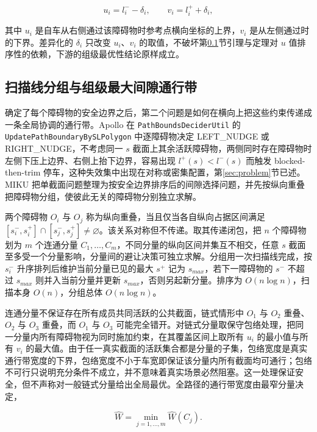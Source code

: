 \documentclass[a4paper,zihao=5]{ctexart}
\theoremstyle{definition}
\begin{document}
\begin{equation}
    u_i = l_i^{-} - \delta_i, \qquad v_i = l_i^{+} + \delta_i,
    \label{eq:dynamic_uv}
\end{equation}

其中 $u_i$ 是自车从右侧通过该障碍物时参考点横向坐标的上界，$v_i$ 是从左侧通过时的下界。差异化的 $\delta_i$ 只改变 $u_i$、$v_i$ 的取值，不破坏第\ref{sec:method_band}节引理与定理对 $u$ 值排序性的依赖，下游的组级最优性结论原样成立。

\subsection{扫描线分组与组级最大间隙通行带}
\label{sec:method_band}

确定了每个障碍物的安全边界之后，第二个问题是如何在横向上把这些约束传递成一条全局协调的通行带。Apollo 在 \texttt{PathBoundsDeciderUtil} 的 \texttt{UpdatePathBoundaryBySLPolygon} 中逐障碍物决定 LEFT\_NUDGE 或 RIGHT\_NUDGE，不考虑同一 $s$ 截面上其余活跃障碍物，两侧同时存在障碍物时左侧下压上边界、右侧上抬下边界，容易出现 $l^{+}(s)<l^{-}(s)$ 而触发 blocked-then-trim 停车，这种失效集中出现在对称或密集配置，第\ref{sec:problem}节已述。MIKU 把单截面问题整理为按安全边界排序后的间隙选择问题，并先按纵向重叠把障碍物分组，使彼此无关的障碍物分别独立求解。

两个障碍物 $O_i$ 与 $O_j$ 称为纵向重叠，当且仅当各自纵向占据区间满足 $[s_i^{-}, s_i^{+}] \cap [s_j^{-}, s_j^{+}] \neq \varnothing$。该关系对称但不传递。取其传递闭包，把 $n$ 个障碍物划为 $m$ 个连通分量 $C_1, \ldots, C_m$，不同分量的纵向区间并集互不相交，任意 $s$ 截面至多受一个分量影响，分量间的避让决策可独立求解。分组用一次扫描线完成，按 $s_i^{-}$ 升序排列后维护当前分量已见的最大 $s^{+}$ 记为 $s_{max}$，若下一障碍物的 $s^{-}$ 不超过 $s_{max}$ 则并入当前分量并更新 $s_{max}$，否则另起新分量。排序为 $O(n\log n)$，扫描本身 $O(n)$，分组总体 $O(n\log n)$。

连通分量不保证存在所有成员共同活跃的公共截面，链式情形中 $O_1$ 与 $O_2$ 重叠、$O_2$ 与 $O_3$ 重叠，而 $O_1$ 与 $O_3$ 可能完全错开。对链式分量取保守包络处理，把同一分量内所有障碍物视为同时施加约束，在其覆盖区间上取所有 $u_i$ 的最小值与所有 $v_i$ 的最大值。由于任一真实截面的活跃集合都是分量的子集，包络宽度是真实通行带宽度的下界，包络宽度不小于车宽即保证该分量内所有截面均可通行；包络不可行只说明充分条件不成立，并不意味着真实场景必然阻塞。这一处理保证安全，但不声称对一般链式分量给出全局最优。全路径的通行带宽度由最窄分量决定，

\begin{equation}
    \hat{W} = \min_{j=1,\ldots,m} \hat{W}(C_j).
    \label{eq:global_width}
\end{equation}
\end{document}
